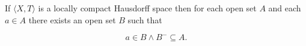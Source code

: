 If $\langle X, T \rangle$ is a locally compact Hausdorff space then for each open set $A$ and each $a \in A$ there exists an open set $B$ such that

$$a \in B \land B^- \subseteq A.$$
